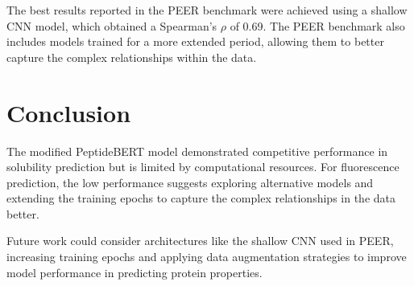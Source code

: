 \documentclass[letterpaper,spanish,reprint,nofootinbib,showkeys,aps]{revtex4-2}
\begin{document}
The best results reported in the PEER benchmark were achieved using a shallow CNN model, which obtained a Spearman's $\rho$ of 0.69. The PEER benchmark also includes models trained for a more extended period, allowing them to better capture the complex relationships within the data. 


\onecolumngrid

\section{Conclusion}
The modified PeptideBERT model demonstrated competitive performance in solubility prediction but is limited by computational resources. For fluorescence prediction, the low performance suggests exploring alternative models and extending the training epochs to capture the complex relationships in the data better.


Future work could consider architectures like the shallow CNN used in PEER, increasing training epochs and applying data augmentation strategies to improve model performance in predicting protein properties.

\onecolumngrid













\end{document}
